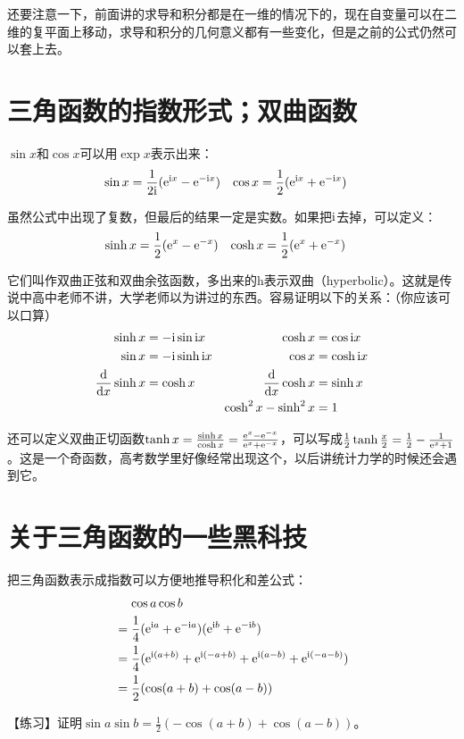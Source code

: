 还要注意一下，前面讲的求导和积分都是在一维的情况下的，现在自变量可以在二维的复平面上移动，求导和积分的几何意义都有一些变化，但是之前的公式仍然可以套上去。
\section{三角函数的指数形式；双曲函数}
$\sin x$和$\cos x$可以用$\exp x$表示出来：
\begin{align*}
\sin x&=\frac{1}{2 \mathrm{i}}(\mathrm{e}^{\mathrm{i} x}-\mathrm{e}^{-\mathrm{i} x}) & \cos x&=\frac{1}{2}(\mathrm{e}^{\mathrm{i} x}+\mathrm{e}^{-\mathrm{i} x})
\end{align*}

虽然公式中出现了复数，但最后的结果一定是实数。如果把$\mathrm{i}$去掉，可以定义：
\begin{align*}
\sinh x&=\frac{1}{2}(\mathrm{e}^x-\mathrm{e}^{-x}) & \cosh x&=\frac{1}{2}(\mathrm{e}^x+\mathrm{e}^{-x})
\end{align*}

它们叫作双曲正弦和双曲余弦函数，多出来的h表示双曲（hyperbolic）。这就是传说中高中老师不讲，大学老师以为讲过的东西。容易证明以下的关系：（你应该可以口算）
\begin{align*}
\sinh x&=-\mathrm{i} \sin \mathrm{i} x & \cosh x&=\cos \mathrm{i} x \\
\sin x&=-\mathrm{i} \sinh \mathrm{i} x & \cos x&=\cosh \mathrm{i} x \\
\frac{\mathop{}\!\mathrm{d}}{\mathop{}\!\mathrm{d} x} \sinh x&=\cosh x & \frac{\mathop{}\!\mathrm{d}}{\mathop{}\!\mathrm{d} x} \cosh x&=\sinh x \\
& & \cosh^2 x-\sinh^2 x&=1
\end{align*}

还可以定义双曲正切函数$\tanh x=\frac{\sinh x}{\cosh x}=\frac{\mathrm{e}^x-\mathrm{e}^{-x}}{\mathrm{e}^x+\mathrm{e}^{-x}}$，可以写成$\frac{1}{2}\tanh\frac{x}{2}=\frac{1}{2}-\frac{1}{\mathrm{e}^x+1}$。这是一个奇函数，高考数学里好像经常出现这个，以后讲统计力学的时候还会遇到它。
\section{关于三角函数的一些黑科技}
把三角函数表示成指数可以方便地推导积化和差公式：
\begin{align*}
&\pheq\cos a \cos b \\
&=\frac{1}{4}(\rme^{\rmi a}+\rme^{-\rmi a})(\rme^{\rmi b}+\rme^{-\rmi b}) \\
&=\frac{1}{4}(\rme^{\rmi (a+b)}+\rme^{\rmi (-a+b)}+\rme^{\rmi (a-b)}+\rme^{\rmi (-a-b)}) \\
&=\frac{1}{2}(\cos(a+b)+\cos(a-b))
\end{align*}

【练习】证明$\sin a \sin b=\frac{1}{2}(-\cos(a+b)+\cos(a-b))$。

